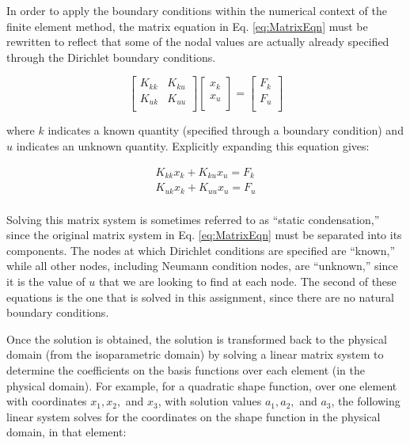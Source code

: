 \documentclass[10pt]{article}
\begin{document}
In order to apply the boundary conditions within the numerical context of the finite element method, the matrix equation in Eq. \eqref{eq:MatrixEqn} must be rewritten to reflect that some of the nodal values are actually already specified through the Dirichlet boundary conditions. 

\begin{equation}
\label{eq:condensation}
\begin{bmatrix}
	K_{kk} & K_{ku}\\
	K_{uk} & K_{uu}\\
\end{bmatrix}
\begin{bmatrix}
	x_k\\
	x_u\\
\end{bmatrix}
=
\begin{bmatrix}
	F_k\\
	F_u\\
\end{bmatrix}
\end{equation}

where \(k\) indicates a known quantity (specified through a boundary condition) and \(u\) indicates an unknown quantity.   Explicitly expanding this equation gives:

\begin{equation}
\begin{aligned}
K_{kk}x_k+K_{ku}x_u=F_k\\
K_{uk}x_k+K_{uu}x_u=F_u\\
\end{aligned}
\end{equation}

Solving this matrix system is sometimes referred to as ``static condensation,'' since the original matrix system in Eq. \eqref{eq:MatrixEqn} must be separated into its components. The nodes at which Dirichlet conditions are specified are ``known,'' while all other nodes, including Neumann condition nodes, are ``unknown,'' since it is the value of \(u\) that we are looking to find at each node. The second of these equations is the one that is solved in this assignment, since there are no natural boundary conditions.

Once the solution is obtained, the solution is transformed back to the physical domain (from the isoparametric domain) by solving a linear matrix system to determine the coefficients on the basis functions over each element (in the physical domain). For example, for a quadratic shape function, over one element with coordinates \(x_1, x_2,\) and \(x_3\), with solution values \(a_1, a_2,\) and \(a_3\), the following linear system solves for the coordinates on the shape function in the physical domain, in that element:
\end{document}
